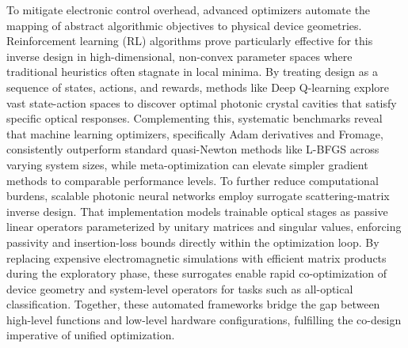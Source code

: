 To mitigate electronic control overhead, advanced optimizers automate the mapping of abstract algorithmic objectives to physical device geometries. Reinforcement learning (RL) algorithms prove particularly effective for this inverse design in high-dimensional, non-convex parameter spaces where traditional heuristics often stagnate in local minima. By treating design as a sequence of states, actions, and rewards, methods like Deep Q-learning explore vast state-action spaces to discover optimal photonic crystal cavities that satisfy specific optical responses. \citep{doi_10_1515_nanoph_2022_0692_4b166807} Complementing this, systematic benchmarks reveal that machine learning optimizers, specifically Adam derivatives and Fromage, consistently outperform standard quasi-Newton methods like L-BFGS across varying system sizes, while meta-optimization can elevate simpler gradient methods to comparable performance levels. To further reduce computational burdens, scalable photonic neural networks employ surrogate scattering-matrix inverse design. That implementation models trainable optical stages as passive linear operators parameterized by unitary matrices and singular values, enforcing passivity and insertion-loss bounds directly within the optimization loop. \citep{s2_753a5d83a96e0194da93bcb6f20fa0bd356e37fa_c11e3796} By replacing expensive electromagnetic simulations with efficient matrix products during the exploratory phase, these surrogates enable rapid co-optimization of device geometry and system-level operators for tasks such as all-optical classification. Together, these automated frameworks bridge the gap between high-level functions and low-level hardware configurations, fulfilling the co-design imperative of unified optimization. \citep{doi_10_1515_nanoph_2022_0692_4b166807} \citep{doi_10_1063_5_0238444_48bf2cbe} \citep{s2_753a5d83a96e0194da93bcb6f20fa0bd356e37fa_c11e3796}


